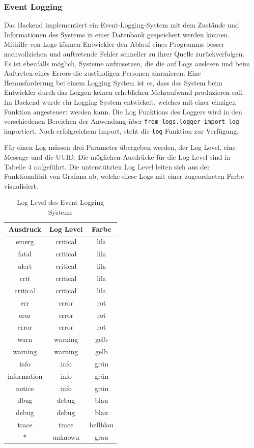 \subsubsection{Event Logging}
Das Backend implementiert ein Event-Logging-System mit dem Zustände und Informationen des Systems in einer Datenbank gespeichert werden können. Mithilfe von Logs können Entwickler den Ablauf eines Programms besser nachvollziehen und auftretende Fehler schneller zu ihrer Quelle zurückverfolgen. Es ist ebenfalls möglich, Systeme aufzusetzen, die die auf Logs auslesen und beim Auftreten eines Errors die zuständigen Personen alarmieren. Eine Herausforderung bei einem Logging System ist es, dass das System beim Entwickler durch das Loggen keinen erheblichen Mehraufwand produzieren soll. Im Backend wurde ein Logging System entwickelt, welches mit einer einzigen Funktion angesteuert werden kann. Die Log Funktions des Loggers wird in den verschiedenen Bereichen der Anwendung über \texttt{from logs.logger import log} importiert. Nach erfolgreichem Import, steht die \texttt{log} Funktion zur Verfügung. 

Für einen Log müssen drei Parameter übergeben werden, der Log Level, eine Message und die UUID. Die möglichen Ausdrücke für die Log Level sind in Tabelle 4 aufgeführt. Die unterstützten Log Level leiten sich aus der Funktionalität von Grafana ab, welche diese Logs mit einer zugeordneten Farbe visualisiert.

\begin{table}[H]
\centering
\begin{tabular}{c|c|c}
\textbf{Ausdruck} & \textbf{Log Level} & \textbf{Farbe}\\
\hline
emerg & critical & lila\\
fatal & critical & lila\\
alert & critical & lila\\
crit & critical & lila\\
critical & critical & lila\\
err & error & rot\\
eror & error & rot\\
error & error & rot\\
warn & warning & gelb\\
warning & warning & gelb\\
info & info & grün\\
information & info & grün\\
notice & info & grün\\
dbug & debug & blau\\
debug & debug & blau\\
trace & trace & hellblau\\
* & unknown & grau
\end{tabular}
\caption{Log Level des Event Logging Systems}
\end{table}

